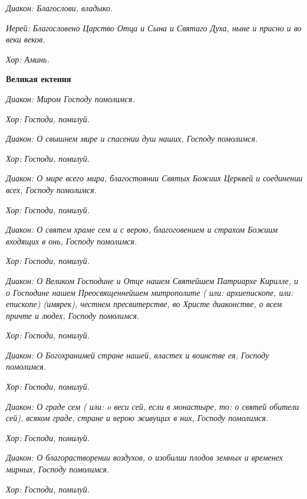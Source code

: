 \itshape Диакон:\normalfont{} Благослови, владыко.


\itshape Иерей:\normalfont{} Благословено Царство Отца и Сына и Святаго Духа, ныне и присно и во веки веков.


\itshape Хор:\normalfont{} Аминь.





\bfseries Великая ектения\normalfont{}


\itshape Диакон:\normalfont{} Миром Господу помолимся.


\itshape Хор:\normalfont{} Господи, помилуй.


\itshape Диакон:\normalfont{} О свышнем мире и спасении душ наших, Господу помолимся.


\itshape Хор:\normalfont{} Господи, помилуй.


\itshape Диакон:\normalfont{} О мире всего мира, благостоянии Святых Божиих Церквей и соединении всех, Господу помолимся.


\itshape Хор:\normalfont{} Господи, помилуй.


\itshape Диакон:\normalfont{} О святем храме сем и с верою, благоговением и страхом Божиим входящих в онь, Господу помолимся.


\itshape Хор:\normalfont{} Господи, помилуй.


\itshape Диакон:\normalfont{} О Великом Господине и Отце нашем Святейшем Патриархе Кирилле, и о Господине нашем Преосвященнейшем митрополите ( \itshape или:\normalfont{} архиепископе, \itshape или:\normalfont{} епископе) \itshape (имярек)\normalfont{}, честнем пресвитерстве, во Христе диаконстве, о всем причте и людех, Господу помолимся.


\itshape Хор:\normalfont{} Господи, помилуй.


\itshape Диакон:\normalfont{} О Богохранимей стране нашей, властех и воинстве ея, Господу помолимся.


\itshape Хор:\normalfont{} Господи, помилуй.


\itshape Диакон:\normalfont{} О граде сем ( \itshape или:\normalfont{} o веси сей, \itshape если в монастыре, то:\normalfont{} о святей обители сей), всяком граде, стране и верою живущих в них, Господу помолимся.


\itshape Хор:\normalfont{} Господи, помилуй.


\itshape Диакон:\normalfont{} О благорастворении воздухов, о изобилии плодов земных и временех мирных, Господу помолимся.


\itshape Хор:\normalfont{} Господи, помилуй.


